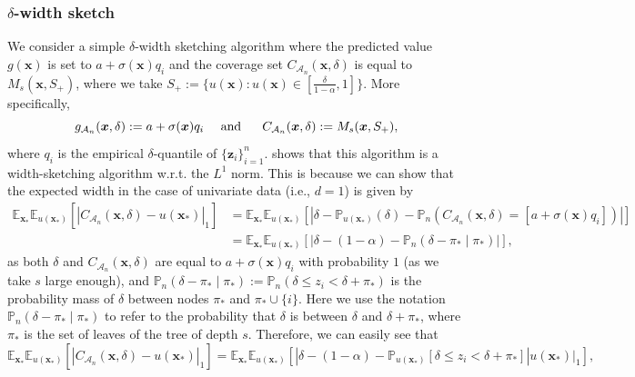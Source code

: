 \documentclass{article} %
\theoremstyle{remark}
\theoremstyle{definition}      %
\begin{document}
\subsubsection{$\delta$-width sketch}
We consider a simple $\delta$-width sketching algorithm where the predicted value $g(\bm{x})$ is set to $a + \sigma(\bm{x}) q_i$ and the coverage set $C_{\mathcal{A}_n}(\bm{x},\delta)$ is equal to $M_s(\bm{x}, S_+)$, where we take $S_+ := \{ u(\bm{x}) : u(\bm{x}) \in [\frac{\delta}{1 - \alpha},1] \}$. More specifically,
\begin{equation} 
  g_{\mathcal{A}_n}(\bm{x},\delta) := a + \sigma(\bm{x}) q_i  ~~~ \text{\normalfont{ and }} ~~~~ C_{\mathcal{A}_n}(\bm{x},\delta) := M_s(\bm{x},S_+),
\end{equation}
where $q_i$ is the empirical $\delta$-quantile of $\{ \bm z_i \}_{i=1}^{n}$.
 shows that this algorithm is a width-sketching algorithm w.r.t. the $L^1$ norm.
This is because we can show that the expected width in the case of univariate data (i.e., $d=1$) is given by
\begin{equation} \label{eq:width_bias}
\begin{split}
  \mathbb{E}_{\bm{x}_*} \mathbb{E}_{u(\bm{x_*})}[|C_{\mathcal{A}_n}(\bm{x},\delta) - u(\bm{x_*})|_1] &= \mathbb{E}_{\bm{x}_*} \mathbb{E}_{u(\bm{x_*})}[|\delta - \mathbb{P}_{u(\bm{x_*})}(\delta) - \mathbb{P}_n(C_{\mathcal{A}_n}(\bm{x},\delta) = [a + \sigma(\bm{x}) q_i])|]  \\
  &= \mathbb{E}_{\bm{x}_*} \mathbb{E}_{u(\bm{x_*})}[|\delta - (1 - \alpha) - \mathbb{P}_n(\delta - \pi_* \mid \pi_*)|],
\end{split}
\end{equation}
as both $\delta$ and $C_{\mathcal{A}_n}(\bm{x},\delta)$ are equal to $a + \sigma(\bm{x}) q_i$ with probability $1$ (as we take $s$ large enough), and $\mathbb{P}_n(\delta - \pi_* \mid \pi_*) := \mathbb{P}_n(\delta \leq z_i < \delta + \pi_*)$ is the probability mass of $\delta$ between nodes $\pi_*$ and $\pi_* \cup \{i\}$. 
Here we use the notation $\mathbb{P}_n(\delta - \pi_* \mid \pi_*)$ to refer to the probability that $\delta$ is between $\delta$ and $\delta + \pi_*$, where $\pi_*$ is the set of leaves of the tree of depth $s$. Therefore, we can easily see that 
\begin{equation}
  \mathbb{E}_{\bm{x}_*} \mathbb{E}_{u(\bm{x_*})}[|C_{\mathcal{A}_n}(\bm{x},\delta) - u(\bm{x_*})|_1] = \mathbb{E}_{\bm{x}_*} \mathbb{E}_{u(\bm{x_*})}[|\delta - (1 - \alpha) - \mathbb{P}_{u(\bm{x_*})}[ \delta \leq z_i < \delta + \pi_*] |u(\bm{x_*})|_1],
\end{equation}
\end{document}
